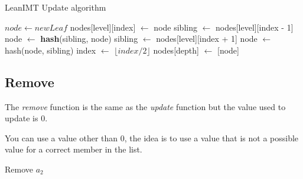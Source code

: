 \documentclass{article}
\begin{document}
\begin{algorithm}[H]
    \caption{LeanIMT Update algorithm}\label{update}
    \begin{algorithmic}[1]
        \State $node\gets newLeaf$
        \State nodes[level][index] $\gets$ node
         
        \State sibling $\gets$ nodes[level][index - 1]
        \State node $\gets$ \textbf{hash}(sibling, node)
        \Else {}
        \State sibling $\gets$ nodes[level][index + 1]
         
        \State node $\gets$ hash(node, sibling)
        \EndIf
        \EndIf
        \State index $\gets$ $\lfloor index/2 \rfloor$ 
        \EndFor
        \State nodes[depth] $\gets$ [node] 
        \EndProcedure
    \end{algorithmic}
\end{algorithm}

\bigbreak

\subsection{Remove}

The \textit{remove} function is the same as the \textit{update} function but the value used to update is 0.

You can use a value other than 0, the idea is to use a value that is not a possible value for a correct member in the list.

\bigbreak

Remove $a_2$

\bigbreak
\end{document}
